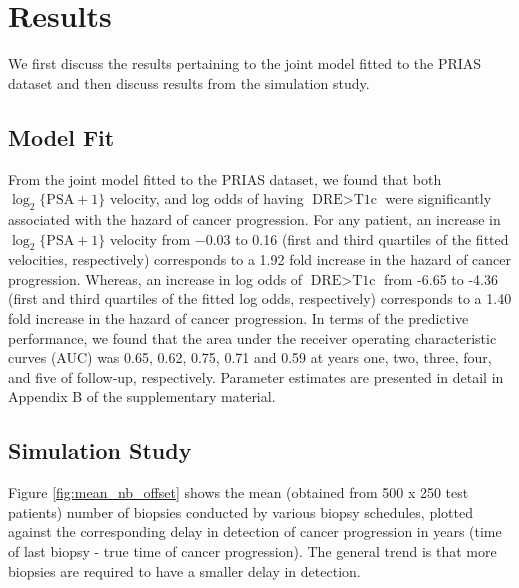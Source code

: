 
\section{Results}
\label{sec:results}
We first discuss the results pertaining to the joint model fitted to the PRIAS dataset and then discuss results from the simulation study.
\subsection{Model Fit}
From the joint model fitted to the PRIAS dataset, we found that both $\log_2 \{\mbox{PSA} + 1\}$ velocity,  and log odds of having $\mbox{DRE} > \mbox{T1c}$  were significantly associated with the hazard of cancer progression. For any patient, an increase in $\log_2 \{\mbox{PSA} + 1\}$ velocity from −0.03 to 0.16 (first and third quartiles of the fitted velocities, respectively) corresponds to a 1.92 fold increase in the hazard of cancer progression. Whereas, an increase in log odds of $\mbox{DRE} > \mbox{T1c}$ from -6.65 to -4.36 (first and third quartiles of the fitted log odds, respectively) corresponds to a 1.40 fold increase in the hazard of cancer progression. In terms of the predictive performance, we found that the area under the receiver operating characteristic curves (AUC) \cite{landmarking2017} was 0.65, 0.62, 0.75, 0.71 and 0.59 at years one, two, three, four, and five of follow‐up, respectively. Parameter estimates are presented in detail in Appendix B of the supplementary material.

\subsection{Simulation Study}
Figure \ref{fig:mean_nb_offset} shows the mean (obtained from 500 x 250 test patients) number of biopsies conducted by various biopsy schedules, plotted against the corresponding delay in detection of cancer progression in years (time of last biopsy - true time of cancer progression). The general trend is that more biopsies are required to have a smaller delay in detection.

